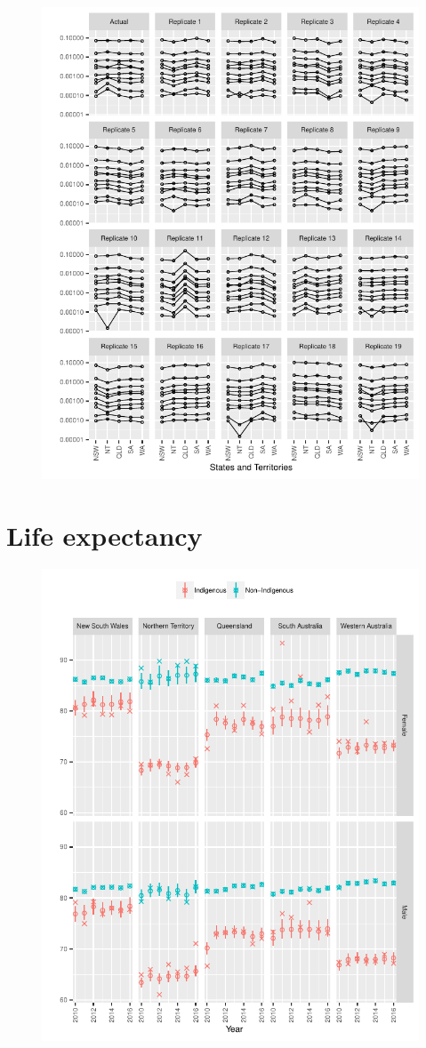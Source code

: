 \documentclass{article}
\begin{document}
\begin{figure}
  \centering
  \includegraphics{out/fig_replicate_data_Male_Non-Indigenous_Baseline}
\end{figure}
\newpage


\clearpage
\section{Life expectancy}
\newpage

\begin{figure}
  \centering
  \includegraphics{out/fig_life_expectancy_Baseline}
\end{figure}
\newpage
\end{document}
